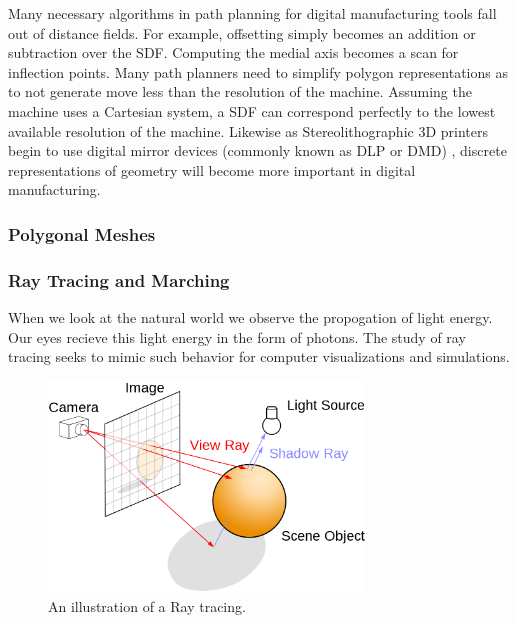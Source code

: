 Many necessary algorithms in path planning for digital manufacturing tools
fall out of distance fields. For example, offsetting simply becomes
an addition or subtraction over the SDF. Computing the medial axis becomes
a scan for inflection points. Many path planners need to simplify polygon
representations as to not generate move less than the resolution of the machine.
Assuming the machine uses a Cartesian system, a SDF can correspond perfectly
to the lowest available resolution of the machine.
Likewise as Stereolithographic 3D printers
begin to use digital mirror devices (commonly known as DLP or DMD)
, discrete representations of geometry will become more important in
digital manufacturing.

\subsubsection{Polygonal Meshes}




\subsubsection{Ray Tracing and Marching}


When we look at the natural world we observe the
propogation of light energy. Our eyes recieve this light energy in the form
of photons. The study of ray tracing seeks to mimic such behavior for
computer visualizations and simulations. 

\begin{figure}[h!]
  \centering
    \includegraphics[width=0.75\textwidth]{img/ray_trace_diagram.png}
  \caption{An illustration of a Ray tracing.\protect\footnotemark}
  \label{fig:raytrace}
\end{figure}

